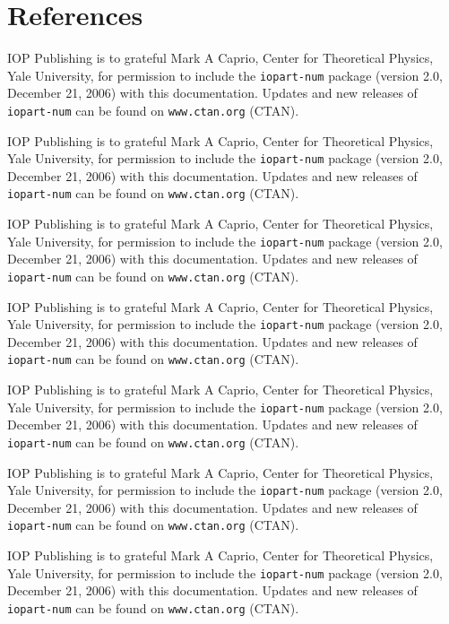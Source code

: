 \documentclass[a4paper]{jpconf}
\begin{document}
\section*{References}
\begin{thebibliography}{9}
     IOP Publishing is to grateful Mark A Caprio, Center for Theoretical Physics, Yale University, for permission to include the {\tt iopart-num} \BibTeX package (version 2.0, December 21, 2006) with  this documentation. Updates and new releases of {\tt iopart-num} can be found on \verb"www.ctan.org" (CTAN).

     IOP Publishing is to grateful Mark A Caprio, Center for Theoretical Physics, Yale University, for permission to include the {\tt iopart-num} \BibTeX package (version 2.0, December 21, 2006) with  this documentation. Updates and new releases of {\tt iopart-num} can be found on \verb"www.ctan.org" (CTAN).

     IOP Publishing is to grateful Mark A Caprio, Center for Theoretical Physics, Yale University, for permission to include the {\tt iopart-num} \BibTeX package (version 2.0, December 21, 2006) with  this documentation. Updates and new releases of {\tt iopart-num} can be found on \verb"www.ctan.org" (CTAN).

     IOP Publishing is to grateful Mark A Caprio, Center for Theoretical Physics, Yale University, for permission to include the {\tt iopart-num} \BibTeX package (version 2.0, December 21, 2006) with  this documentation. Updates and new releases of {\tt iopart-num} can be found on \verb"www.ctan.org" (CTAN).

     IOP Publishing is to grateful Mark A Caprio, Center for Theoretical Physics, Yale University, for permission to include the {\tt iopart-num} \BibTeX package (version 2.0, December 21, 2006) with  this documentation. Updates and new releases of {\tt iopart-num} can be found on \verb"www.ctan.org" (CTAN).

     IOP Publishing is to grateful Mark A Caprio, Center for Theoretical Physics, Yale University, for permission to include the {\tt iopart-num} \BibTeX package (version 2.0, December 21, 2006) with  this documentation. Updates and new releases of {\tt iopart-num} can be found on \verb"www.ctan.org" (CTAN).

     IOP Publishing is to grateful Mark A Caprio, Center for Theoretical Physics, Yale University, for permission to include the {\tt iopart-num} \BibTeX package (version 2.0, December 21, 2006) with  this documentation. Updates and new releases of {\tt iopart-num} can be found on \verb"www.ctan.org" (CTAN).


\end{thebibliography}
\end{document}
